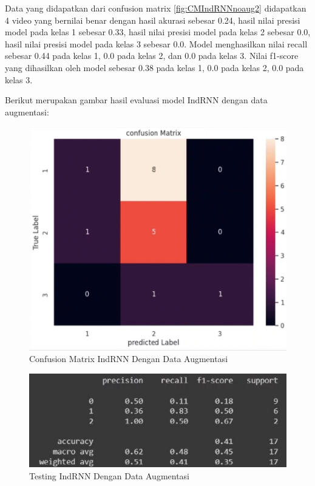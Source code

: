 Data yang didapatkan dari confusion matrix \ref{fig:CMIndRNNnoaug2} didapatkan 4 video yang bernilai benar
dengan hasil akurasi sebesar 0.24, hasil nilai presisi model pada kelas 1 sebesar 0.33, hasil nilai
presisi model pada kelas 2 sebesar 0.0, hasil nilai presisi model pada kelas 3 sebesar 0.0. Model menghasilkan
nilai recall sebesar 0.44 pada kelas 1, 0.0 pada kelas 2, dan 0.0 pada kelas 3. Nilai f1-score yang dihasilkan
oleh model sebesar 0.38 pada kelas 1, 0.0 pada kelas 2, 0.0 pada kelas 3.

Berikut merupakan gambar hasil evaluasi model IndRNN  dengan data augmentasi:
\newpage
\begin{figure} [H] \centering
  \includegraphics[scale=1.3]{gambar/CMIndRNNaug2.png}
  \caption{Confusion Matrix IndRNN Dengan Data Augmentasi}
  \label{fig:CMIndRNNaug2}
\end{figure}

\begin{figure} [H] \centering
  \includegraphics[scale=1]{gambar/scoreIndRNNaug2.png}
  \caption{Testing IndRNN Dengan Data Augmentasi}
  \label{fig:ScoreIndRNNaug}
\end{figure}


